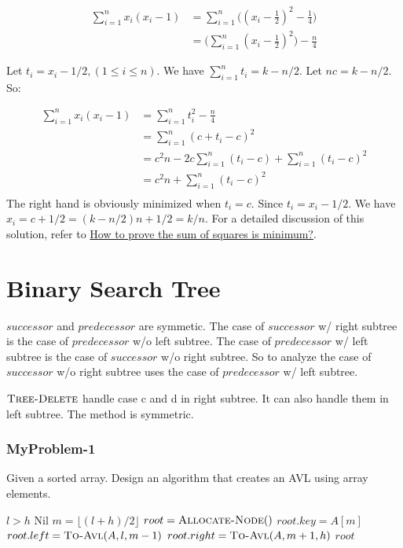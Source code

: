 \documentclass{book}
\begin{document}
\begin{CJK}{UTF8}{gkai}
\begin{align*}
\sum_{i=1}^{n}x_i(x_i-1) & = 
\sum_{i=1}^{n}\Big((x_i-\frac{1}{2})^2-\frac{1}{4}\Big) \\
& = \Big(\sum_{i=1}^{n}(x_i-\frac{1}{2})^2\Big)-\frac{n}{4}
\end{align*}

Let $t_i=x_i-1/2, (1\le i \le n)$. We have $\sum_{i=1}^{n}t_i=k-n/2$. Let 
$nc=k-n/2$. So:

\begin{align*}
\sum_{i=1}^{n}x_i(x_i-1) & = \sum_{i=1}^{n}t_i^2-\frac{n}{4} \\
& = \sum_{i=1}^{n}(c+t_i-c)^2 \\
& = c^2n-2c\sum_{i=1}^{n}(t_i-c)+\sum_{i=1}^{n}(t_i-c)^2 \\
& = c^2n+\sum_{i=1}^{n}(t_i-c)^2 \\
\end{align*}
The right hand is obviously minimized when $t_i=c$. Since $t_i=x_i-1/2$. We have 
$x_i=c+1/2=(k-n/2)n+1/2=k/n$. For a detailed discussion of this solution, refer 
to 
\href{http://math.stackexchange.com/questions/67192/how-to-prove-the-sum-of-squares-is-minimum}{How 
to prove the sum of squares is minimum?}.

\chapter{Binary Search Tree}

$successor$ and $predecessor$ are symmetic. The case of $successor$ w/ right 
subtree is the case of $predecessor$ w/o left subtree. The case of $predecessor$ 
w/ left subtree is the case of $successor$ w/o right subtree. So to analyze the 
case of $successor$ w/o right subtree uses the case of $predecessor$ w/ left 
subtree.

$\textnormal{\scshape Tree-Delete}$ handle case c and d in right subtree. It can also handle
them in left subtree. The method is symmetric.

\subsection*{MyProblem-1}
Given a sorted array. Design an algorithm that creates an AVL using array 
elements.

\begin{codebox}
\li \If $l > h$
\li \Then \Return Nil
\End
\li $m = \lfloor(l + h)/2 \rfloor $
\li $root = \textnormal{\scshape Allocate-Node}()$
\li $root.key = A[m]$
\li $root.left = \textnormal{\scshape To-Avl}(A, l, m-1)$
\li $root.right = \textnormal{\scshape To-Avl}(A, m+1, h)$
\li \Return $root$
\end{codebox}


\end{CJK}
\end{document}
